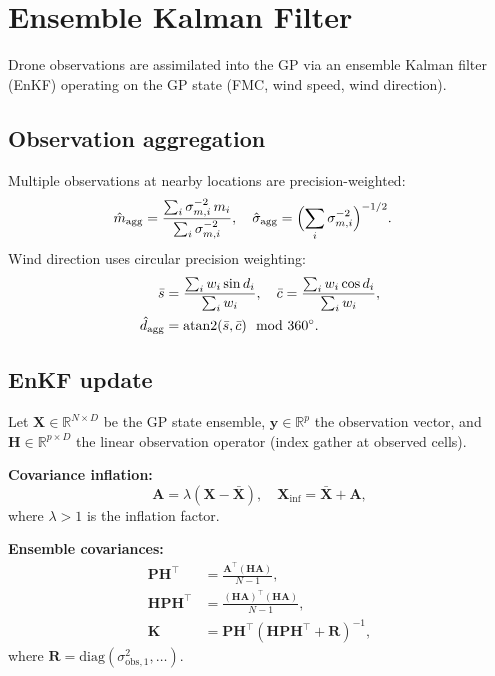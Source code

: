 \documentclass[11pt,twocolumn]{article}
\newcommand{\R}{\mathbb{R}}
\begin{document}
\section{Ensemble Kalman Filter}
\label{sec:enkf}

Drone observations are assimilated into the GP via an ensemble Kalman
filter (EnKF) operating on the GP state (FMC, wind speed, wind direction).

\subsection{Observation aggregation}

Multiple observations at nearby locations are precision-weighted:
\begin{align}
  \hat{m}_{\mathrm{agg}} &=
    \frac{\sum_i \sigma_{m,i}^{-2}\,m_i}{\sum_i \sigma_{m,i}^{-2}},\quad
  \hat{\sigma}_{\mathrm{agg}} = \Bigl(\sum_i\sigma_{m,i}^{-2}\Bigr)^{-1/2}.
  \label{eq:wm}
\end{align}
Wind direction uses circular precision weighting:
\begin{align}
  \bar{s} &= \frac{\sum_i w_i\sin d_i}{\sum_i w_i},\quad
  \bar{c} = \frac{\sum_i w_i\cos d_i}{\sum_i w_i},\notag\\
  \hat{d}_{\mathrm{agg}} &= \operatorname{atan2}(\bar{s},\bar{c})\mod360^\circ.
  \label{eq:circmean}
\end{align}

\subsection{EnKF update}

Let $\mathbf{X}\in\R^{N\times D}$ be the GP state ensemble,
$\mathbf{y}\in\R^p$ the observation vector, and
$\mathbf{H}\in\R^{p\times D}$ the linear observation operator (index
gather at observed cells).

\textbf{Covariance inflation:}
\begin{equation}
  \mathbf{A} = \lambda(\mathbf{X}-\bar{\mathbf{X}}),\quad
  \mathbf{X}_{\mathrm{inf}} = \bar{\mathbf{X}} + \mathbf{A},
  \label{eq:inflation}
\end{equation}
where $\lambda>1$ is the inflation factor.

\textbf{Ensemble covariances:}
\begin{align}
  \mathbf{PH}^\top &= \frac{\mathbf{A}^\top(\mathbf{HA})}{N-1},\label{eq:pht}\\
  \mathbf{HPH}^\top &= \frac{(\mathbf{HA})^\top(\mathbf{HA})}{N-1},\label{eq:hpht}\\
  \mathbf{K} &= \mathbf{PH}^\top(\mathbf{HPH}^\top+\mathbf{R})^{-1},\label{eq:K}
\end{align}
where $\mathbf{R}=\mathrm{diag}(\sigma_{\mathrm{obs},1}^2,\ldots)$.
\end{document}

